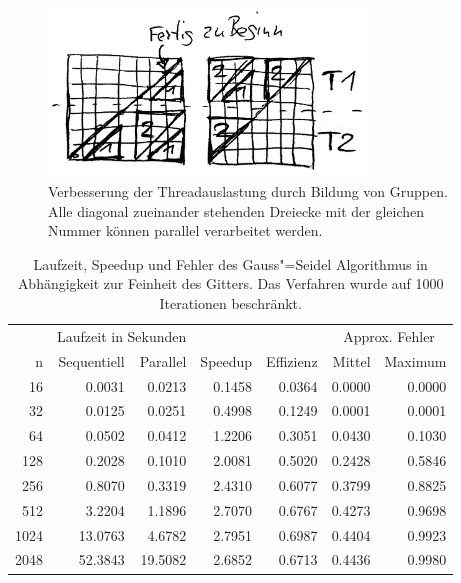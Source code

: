 \documentclass[paper = a4]{scrartcl}
\begin{document}
\begin{figure}
    \centering
    \includegraphics[width=0.75\textwidth]{gaussseideldreiecke-bw}
    \caption{Verbesserung der Threadauslastung durch Bildung von Gruppen. Alle diagonal zueinander stehenden Dreiecke mit der gleichen Nummer können parallel verarbeitet werden.}
    \label{fig:gaussseideldreiecke}
\end{figure}

\begin{table}
    \centering
    \begin{tabular}{|r|r|r|r|r|r|r|} \hline
    & \multicolumn{2}{c|}{Laufzeit in Sekunden} & & & \multicolumn{2}{c|}{Approx. Fehler} \\
    n    & Sequentiell & Parallel & Speedup & Effizienz & Mittel & Maximum \\ \hline \hline
    16   & 0.0031      & 0.0213   & 0.1458  & 0.0364    & 0.0000 & 0.0000 \\
    32   & 0.0125      & 0.0251   & 0.4998  & 0.1249    & 0.0001 & 0.0001 \\
    64   & 0.0502      & 0.0412   & 1.2206  & 0.3051    & 0.0430 & 0.1030 \\
    128  & 0.2028      & 0.1010   & 2.0081  & 0.5020    & 0.2428 & 0.5846 \\
    256  & 0.8070      & 0.3319   & 2.4310  & 0.6077    & 0.3799 & 0.8825 \\
    512  & 3.2204      & 1.1896   & 2.7070  & 0.6767    & 0.4273 & 0.9698 \\
    1024 & 13.0763     & 4.6782   & 2.7951  & 0.6987    & 0.4404 & 0.9923 \\
    2048 & 52.3843     & 19.5082  & 2.6852  & 0.6713    & 0.4436 & 0.9980 \\ \hline
    \end{tabular}
    \caption{Laufzeit, Speedup und Fehler des Gauss"=Seidel Algorithmus in Abhängigkeit zur Feinheit des Gitters. Das Verfahren wurde auf 1000 Iterationen beschränkt.}
    \label{tab:gaussseidel}
\end{table}
\end{document}
